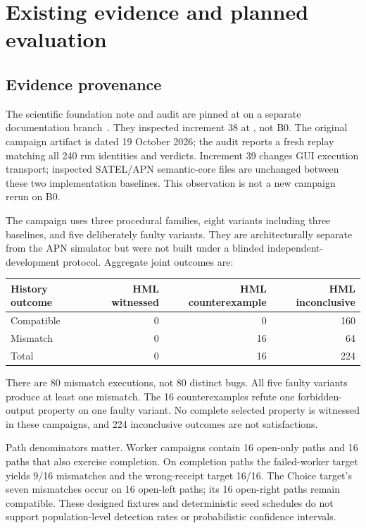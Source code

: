\section{Existing evidence and planned evaluation}
\subsection{Evidence provenance}
The scientific foundation note and audit are pinned at
 on a separate documentation branch~\cite{audit}. They inspected
increment 38 at , not B0. The original campaign artifact is dated
19 October 2026; the audit reports a fresh replay matching all 240 run identities
and verdicts. Increment 39 changes GUI execution transport; inspected SATEL/APN
semantic-core files are unchanged between these two implementation baselines.
This observation is not a new campaign rerun on B0.

The campaign uses three procedural families, eight variants including three
baselines, and five deliberately faulty variants. They are architecturally separate
from the APN simulator but were not built under a blinded independent-development
protocol. Aggregate joint outcomes are:
\begin{center}
\begin{tabular}{lrrr}\toprule
History outcome & HML witnessed & HML counterexample & HML inconclusive\\\midrule
Compatible & 0 & 0 & 160\\
Mismatch & 0 & 16 & 64\\\midrule
Total & 0 & 16 & 224\\\bottomrule
\end{tabular}
\end{center}
There are 80 mismatch executions, not 80 distinct bugs. All five faulty variants
produce at least one mismatch. The 16 counterexamples refute one forbidden-output
property on one faulty variant. No complete selected property is witnessed in
these campaigns, and 224 inconclusive outcomes are not satisfactions.

Path denominators matter. Worker campaigns contain 16 open-only paths and 16 paths
that also exercise completion. On completion paths the failed-worker target yields
9/16 mismatches and the wrong-receipt target 16/16. The Choice target's seven
mismatches occur on 16 open-left paths; its 16 open-right paths remain compatible.
These designed fixtures and deterministic seed schedules do not support
population-level detection rates or probabilistic confidence intervals.

